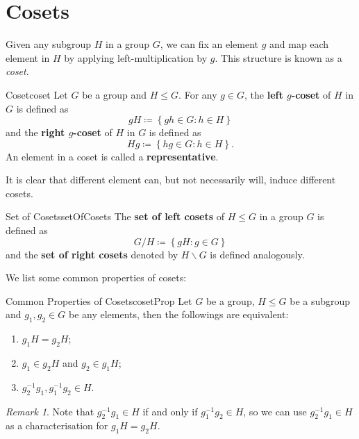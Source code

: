 \documentclass[math]{amznotes}
\theoremstyle{remark}
\newtheorem*{remark}{Remark}
\newcommand{\0}{\mathbf{0}}
\newcommand{\1}{\mathbf{1}}
\begin{document}
\section{Cosets}
Given any subgroup $H$ in a group $G$, we can fix an element $g$ and map each element in $H$ by applying left-multiplication by $g$. This structure is known as a \textit{coset}.
\begin{dfnbox}{Coset}{coset}
    Let $G$ be a group and $H \leq G$. For any $g \in G$, the {\color{red} \textbf{left $g$-coset}} of $H$ in $G$ is defined as 
    \begin{equation*}
        gH \coloneqq \left\{gh \in G \colon h \in H\right\}
    \end{equation*}
    and the {\color{red} \textbf{right $g$-coset}} of $H$ in $G$ is defined as 
    \begin{equation*}
        Hg \coloneqq \left\{hg \in G \colon h \in H\right\}.
    \end{equation*}
    An element in a coset is called a {\color{red} \textbf{representative}}.
\end{dfnbox}
It is clear that different element can, but not necessarily will, induce different cosets.
\begin{dfnbox}{Set of Cosets}{setOfCosets}
    The {\color{red} \textbf{set of left cosets}} of $H \leq G$ in a group $G$ is defined as 
    \begin{equation*}
        G \slash H \coloneqq \left\{gH \colon g \in G\right\}
    \end{equation*}
    and the {\color{red} \textbf{set of right cosets}} denoted by $H \backslash G$ is defined analogously.
\end{dfnbox}
We list some common properties of cosets:
\begin{probox}{Common Properties of Cosets}{cosetProp}
    Let $G$ be a group, $H \leq G$ be a subgroup and $g_1, g_2 \in G$ be any elements, then the followings are equivalent:
    \begin{enumerate}
        \item $g_1H = g_2H$;
        \item $g_1 \in g_2H$ and $g_2 \in g_1H$;
        \item $g_2^{-1}g_1, g_1^{-1}g_2 \in H$.
    \end{enumerate}
\end{probox}
\begin{notebox}
    \begin{remark}
        Note that $g_2^{-1}g_1 \in H$ if and only if $g_1^{-1}g_2 \in H$, so we can use $g_2^{-1}g_1 \in H$ as a characterisation for $g_1H = g_2H$.
    \end{remark}
\end{notebox}
\end{document}
